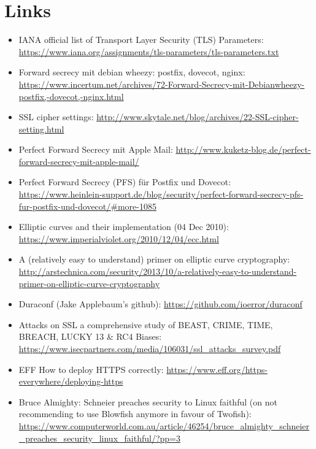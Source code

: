 \section{Links}



\begin{itemize}
\item IANA official list of Transport Layer Security (TLS) Parameters: \url{https://www.iana.org/assignments/tls-parameters/tls-parameters.txt}
\item Forward secrecy mit debian wheezy: postfix, dovecot, nginx: \url{https://www.incertum.net/archives/72-Forward-Secrecy-mit-Debianwheezy-postfix,-dovecot,-nginx.html}
\item SSL cipher settings: \url{http://www.skytale.net/blog/archives/22-SSL-cipher-setting.html}
\item Perfect Forward Secrecy mit Apple Mail: \url{http://www.kuketz-blog.de/perfect-forward-secrecy-mit-apple-mail/}
\item Perfect Forward Secrecy (PFS) f\"ur Postfix und Dovecot: \url{https://www.heinlein-support.de/blog/security/perfect-forward-secrecy-pfs-fur-postfix-und-dovecot/#more-1085}
\item Elliptic curves and their implementation (04 Dec 2010): \url{https://www.imperialviolet.org/2010/12/04/ecc.html}
\item A (relatively easy to understand) primer on elliptic curve cryptography: \url{http://arstechnica.com/security/2013/10/a-relatively-easy-to-understand-primer-on-elliptic-curve-cryptography}
\item Duraconf (Jake Applebaum's github): \url{https://github.com/ioerror/duraconf}
\item Attacks on SSL a comprehensive study of BEAST, CRIME, TIME, BREACH, LUCKY 13 \& RC4 Biases: \url{https://www.isecpartners.com/media/106031/ssl_attacks_survey.pdf}
\item EFF How to deploy HTTPS correctly: \url{https://www.eff.org/https-everywhere/deploying-https}
\item Bruce Almighty: Schneier preaches security to Linux faithful (on not recommending to use Blowfish anymore in favour of Twofish): \url{https://www.computerworld.com.au/article/46254/bruce_almighty_schneier_preaches_security_linux_faithful/?pp=3}
\end{itemize}
